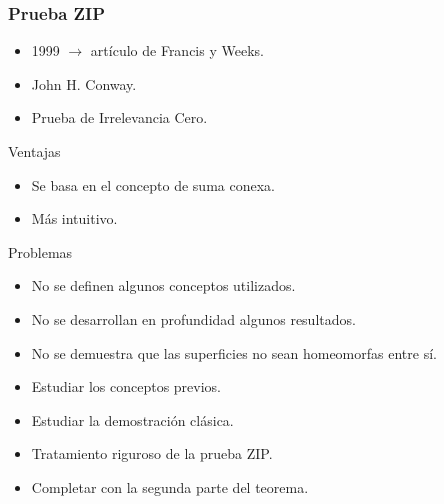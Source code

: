\documentclass{beamer}
\theoremstyle{definition}
\begin{document}
\begin{frame}
\frametitle{Prueba ZIP}
\begin{itemize}

\item 1999 $\longrightarrow$ artículo de Francis y Weeks.

\item John H. Conway.

\item Prueba de Irrelevancia Cero. 
\end{itemize}
\pause

\begin{block}{Ventajas}

\begin{itemize}
\item Se basa en el concepto de suma conexa.
\item  Más intuitivo.\pause
\end{itemize}
\end{block}

\begin{block}{Problemas}

\begin{itemize}
\item No se definen algunos conceptos utilizados. 
\item No se desarrollan en profundidad algunos resultados.
\item No se demuestra que las superficies no sean homeomorfas entre sí. 
\end{itemize}
\end{block}

\end{frame}

\begin{frame}

\begin{itemize}
\frametitle{Trabajo}
\item Estudiar los conceptos previos.
\item Estudiar la demostración clásica.
\item Tratamiento riguroso de la prueba ZIP.
\item Completar con la segunda parte del teorema.
\end{itemize}
\end{frame}
\end{document}
